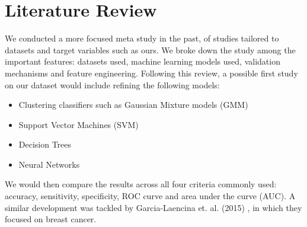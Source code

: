 \documentclass[a4paper]{article}
\begin{document}
\section{Literature Review}
We conducted a more focused meta study in the past, of studies tailored to datasets and target variables such as ours. We broke down the study among the important features: datasets used, machine learning models used, validation mechanisms and  feature engineering. 
Following this review, a possible first study on our dataset would include refining the following models:
\begin{itemize}
\item Clustering classifiers such as Gaussian Mixture models (GMM) 
\item Support Vector Machines (SVM)
\item Decision Trees 
\item Neural Networks
\end{itemize}
We would then compare the results across all four criteria commonly used: accuracy, sensitivity, specificity, ROC curve and area under the curve (AUC). A similar development was tackled by Garcia-Laencina et. al. (2015) \cite{Garcia-Laencina2015}, in which they focused on breast cancer. 
\end{document}
